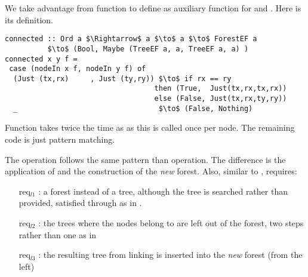 We take advantage from function  to define  as auxiliary function for \cut and \link. Here is its definition.
\begin{lstlisting}[mathescape] 
connected :: Ord a $\Rightarrow$ a $\to$ a $\to$ ForestEF a
          $\to$ (Bool, Maybe (TreeEF a, a, TreeEF a, a) ) 
connected x y f = 
 case (nodeIn x f, nodeIn y f) of 
  (Just (tx,rx)     , Just (ty,ry)) $\to$ if rx == ry 
                                   then (True,  Just(tx,rx,tx,rx))  
                                   else (False, Just(tx,rx,ty,ry)) 
  _                                 $\to$ (False, Nothing) 
\end{lstlisting} 
Function  takes twice the time as  as this is called once per node. The remaining code is just pattern matching. 

The \link operation follows the same pattern than \cut operation. The difference is the application of  and the construction of the \textit{new} forest. Also, similar to \cut, \link requires:
\begin{itemize}
\item [req$_{l1}$]: a forest instead of a tree, although the tree is searched rather than provided, satisfied through  as in \cut.
\item [req$_{l2}$]: the trees where the nodes belong to are left out of the forest, two steps rather than one as in \cut
\item [req$_{l3}$]: the resulting tree from linking is inserted into the \textit{new} forest (from the left)
\end{itemize}

